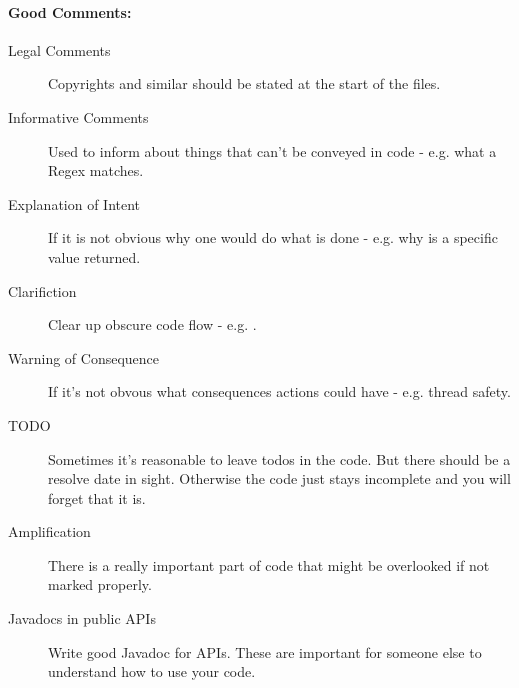 \documentclass[a4paper, twocolumn]{article}
\newcommand{\code}[1]{\texttt{\color{black}{#1}}}
\begin{document}
\paragraph{Good Comments:}
\begin{description}
	\item[Legal Comments] Copyrights and similar should be stated at the start of the files.
	\item[Informative Comments] Used to inform about things that can't be conveyed in code - e.g. what a Regex matches.
	\item[Explanation of Intent] If it is not obvious why one would do what is done - e.g. why is a specific value returned.
	\item[Clarifiction] Clear up obscure code flow - e.g. \code{a.compare(b) == -1; // a < b}.
	\item[Warning of Consequence] If it's not obvous what consequences actions could have - e.g. thread safety.
	\item[TODO] Sometimes it's reasonable to leave todos in the code. But there should be a resolve date in sight. Otherwise the code just stays incomplete and you will forget that it is.
	\item[Amplification] There is a really important part of code that might be overlooked if not marked properly.
	\item[Javadocs in public APIs] Write good Javadoc for APIs. These are important for someone else to understand how to use your code.
\end{description}
\end{document}
